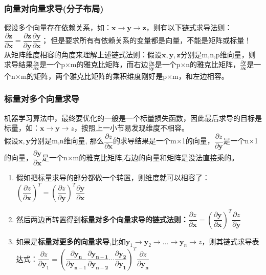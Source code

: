     \subsubsection{向量对向量求导(分子布局)}
    假设多个向量存在依赖关系，如：$\mathbf{x} \rightarrow \mathbf{y} \rightarrow \mathbf{z}$，则有以下链式求导法则：$\dfrac{\partial \mathbf{z}}{\partial \mathbf{x}}=\dfrac{\partial \mathbf{z}}{\partial \mathbf{y}} \dfrac{\partial \mathbf{y}}{\partial \mathbf{x}}$；
    但是要求所有有依赖关系的变量都是向量，不能是矩阵或标量！
    \\
    从矩阵维度相容的角度来理解上述链式法则：假设$\mathbf{x}, \mathbf{y}, \mathbf{z}$分别是m,n,p维向量，则求导结果$\frac{\partial \mathbf{z}}{\partial \mathbf{x}}$是一个p×m的雅克比矩阵，而右边$\frac{\partial \mathbf{z}}{\partial \mathbf{y}}$是一个p×n的雅克比矩阵，$\frac{\partial \mathbf{y}}{\partial \mathbf{x}}$是一个n×m的矩阵，两个雅克比矩阵的乘积维度刚好是p×m，和左边相容。

    \subsubsection{标量对多个向量求导}
    机器学习算法中，最终要优化的一般是一个标量损失函数，因此最后求导的目标是标量，如：$\mathbf{x} \rightarrow \mathbf{y} \rightarrow z$，按照上一小节易发现维度不相容。
    \\
    假设$\bm{x,y}$分别是m,n维向量, 那么$\dfrac{\partial z}{\partial \bm{x}}$的求导结果是一个m×1的向量，$\dfrac{\partial z}{\partial \bm{y}}$是一个n×1的向量，$\dfrac{\partial \mathbf{y}}{\partial \mathbf{x}}$是一个n×m的雅克比矩阵,右边的向量和矩阵是没法直接乘的。
    \\
    \begin{enumerate}
        \item 假如把标量求导的部分都做一个转置，则维度就可以相容了：$\left(\dfrac{\partial z}{\partial \mathbf{x}}\right)^{T}=\left(\dfrac{\partial z}{\partial \mathbf{y}}\right)^{T} \dfrac{\partial \mathbf{y}}{\partial \mathbf{x}}$
        \item 然后两边再转置得到\textbf{标量对多个向量求导的链式法则：}$\dfrac{\partial z}{\partial \mathbf{x}}=\left(\dfrac{\partial \mathbf{y}}{\partial \mathbf{x}}\right)^{T} \dfrac{\partial z}{\partial \mathbf{y}}$
        \item 如果是\textbf{标量对更多的向量求导},比如$\mathbf{y}_{1} \rightarrow \mathbf{y}_{2} \rightarrow \ldots \rightarrow \mathbf{y}_{n} \rightarrow z$，则其链式求导表达式：$\dfrac{\partial z}{\partial \mathbf{y}_{1}}=\left(\dfrac{\partial \mathbf{y}_{\mathbf{n}}}{\partial \mathbf{y}_{\mathbf{n}-1}} \dfrac{\partial \mathbf{y}_{\mathbf{n}-\mathbf{1}}}{\partial \mathbf{y}_{\mathbf{n}-\mathbf{2}}} \cdots \dfrac{\partial \mathbf{y}_{\mathbf{2}}}{\partial \mathbf{y}_{\mathbf{1}}}\right)^{T} \dfrac{\partial z}{\partial \mathbf{y}_{\mathbf{n}}}$
    \end{enumerate}

